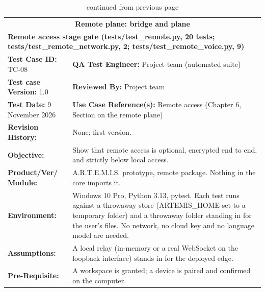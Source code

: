 \documentclass{FastFyp}
\begin{document}
{\small
{}
\begin{longtable}{|p{2.4cm}p{5.0cm}p{2.4cm}p{3.8cm}|}
\caption{Test case TC-08: remote device limits.}\label{tab:tc8}\\*
\endfirsthead
\caption[]{continued from previous page}\\*
\endhead
\hline
\multicolumn{4}{|c|}{\textbf{Remote plane: bridge and plane}} \\* \hline
\multicolumn{4}{|p{14.8cm}|}{\textbf{Remote access stage gate (tests/test\_remote.py, 20 tests; tests/test\_remote\_network.py, 2; tests/test\_remote\_voice.py, 9)}} \\* \hline
\multicolumn{2}{|p{7.8cm}|}{\textbf{Test Case ID:} TC-08} &
  \multicolumn{2}{p{6.6cm}|}{\textbf{QA Test Engineer:} Project team (automated suite)} \\* \hline
\multicolumn{2}{|p{7.8cm}|}{\textbf{Test case Version:} 1.0} &
  \multicolumn{2}{p{6.6cm}|}{\textbf{Reviewed By:} Project team} \\* \hline
\multicolumn{2}{|p{7.8cm}|}{\textbf{Test Date:} 9 November 2026} &
  \multicolumn{2}{p{6.6cm}|}{\textbf{Use Case Reference(s):} Remote access (Chapter 6, Section on the remote plane)} \\ \hline
\multicolumn{1}{|p{2.4cm}|}{\textbf{Revision History:}} &
  \multicolumn{3}{p{12.0cm}|}{None; first version.} \\ \hline
\multicolumn{1}{|p{2.4cm}|}{\textbf{Objective:}} &
  \multicolumn{3}{p{12.0cm}|}{Show that remote access is optional, encrypted end to end, and strictly below local access.} \\ \hline
\multicolumn{1}{|p{2.4cm}|}{\textbf{Product/Ver/ Module:}} &
  \multicolumn{3}{p{12.0cm}|}{A.R.T.E.M.I.S. prototype, remote package. Nothing in the core imports it.} \\ \hline
\multicolumn{1}{|p{2.4cm}|}{\textbf{Environment:}} &
  \multicolumn{3}{p{12.0cm}|}{Windows 10 Pro, Python 3.13, pytest. Each test runs against a throwaway store (ARTEMIS\_HOME set to a temporary folder) and a throwaway folder standing in for the user's files. No network, no cloud key and no language model are needed.} \\ \hline
\multicolumn{1}{|p{2.4cm}|}{\textbf{Assumptions:}} &
  \multicolumn{3}{p{12.0cm}|}{A local relay (in-memory or a real WebSocket on the loopback interface) stands in for the deployed edge.} \\ \hline
\multicolumn{1}{|p{2.4cm}|}{\textbf{Pre-Requisite:}} &
  \multicolumn{3}{p{12.0cm}|}{A workspace is granted; a device is paired and confirmed on the computer.} \\ \hline

\end{longtable}}
\end{document}
